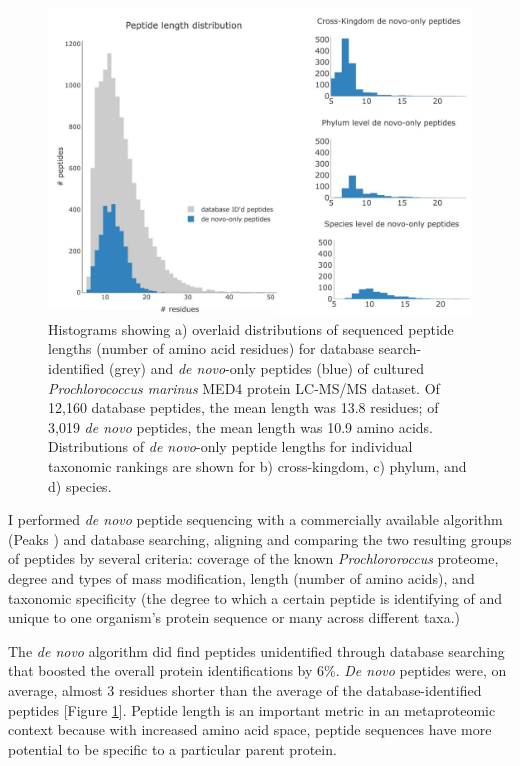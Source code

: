 \documentclass[12pt, letterpaper, twoside]{article}
\begin{document}
\begin{figure}
	\includegraphics[width=\linewidth]{fig1-denovo.jpg}
	\caption{Histograms showing a) overlaid distributions of sequenced peptide lengths (number of amino acid residues) for database search-identified (grey) and \textit{de novo}-only peptides (blue) of cultured \textit{Prochlorococcus marinus} MED4 protein LC-MS/MS dataset. Of 12,160 database peptides, the mean length was 13.8 residues; of 3,019 \textit{de novo} peptides, the mean length was 10.9 amino acids. Distributions of \textit{de novo}-only peptide lengths for individual taxonomic rankings are shown for b) cross-kingdom, c) phylum, and d) species.}
	\label{fig:de-novo-hists}
\end{figure}

I performed \textit{de novo} peptide sequencing with a commercially available algorithm (Peaks \cite{ma_peaks:_2003}) and database searching, aligning and comparing the two resulting groups of peptides by several criteria: coverage of the known \textit{Prochlororoccus} proteome, degree and types of mass modification, length (number of amino acids), and taxonomic specificity (the degree to which a certain peptide is identifying of and unique to one organism's protein sequence or many across different taxa.)

The \textit{de novo} algorithm did find peptides unidentified through database searching that boosted the overall protein identifications by 6\%. \textit{De novo} peptides were, on average, almost 3 residues shorter than the average of the database-identified peptides [Figure \ref{fig:de-novo-hists}]. Peptide length is an important metric in an metaproteomic context because with increased amino acid space, peptide sequences have more potential to be specific to a particular parent protein. 
\end{document}
